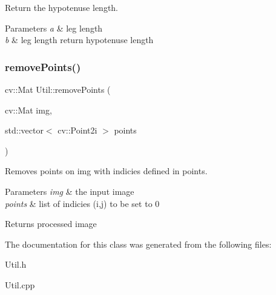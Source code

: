Return the hypotenuse length. 


\begin{DoxyParams}{Parameters}
{\em a} & leg length \\
\hline
{\em b} & leg length return hypotenuse length \\
\hline
\end{DoxyParams}
\hypertarget{class_util_abf2cc717b8e145166f247df2742a0325}{}\label{class_util_abf2cc717b8e145166f247df2742a0325} 
\subsubsection{\texorpdfstring{remove\+Points()}{removePoints()}}
{\footnotesize\ttfamily cv\+::\+Mat Util\+::remove\+Points (\begin{DoxyParamCaption}\item[{cv\+::\+Mat}]{img,  }\item[{std\+::vector$<$ cv\+::\+Point2i $>$}]{points }\end{DoxyParamCaption})\hspace{0.3cm}{\ttfamily [static]}}



Removes points on img with indicies defined in points. 


\begin{DoxyParams}{Parameters}
{\em img} & the input image \\
\hline
{\em points} & list of indicies (i,j) to be set to 0 \\
\hline
\end{DoxyParams}
\begin{DoxyReturn}{Returns}
processed image 
\end{DoxyReturn}


The documentation for this class was generated from the following files\+:\begin{DoxyCompactItemize}
\item 
Util.\+h\item 
Util.\+cpp\end{DoxyCompactItemize}
